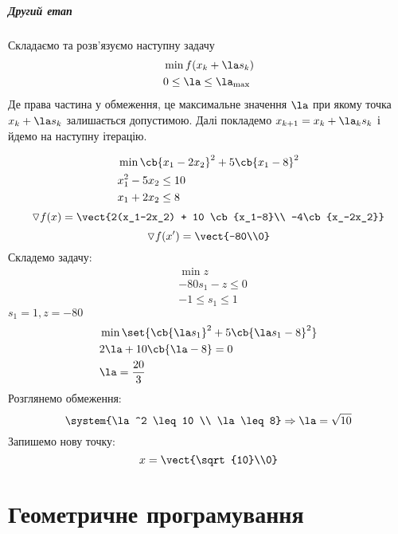 \paragraph{Другий етап} Складаємо та розв’язуємо наступну задачу 
\begin{eqnarray}
&\min f(x_k+\la s_k)\\
&0\leq \la \leq \la_{\max}
\end{eqnarray}
Де права частина у обмеження, це максимальне значення $\la$ при якому точка $x_k+\la s_k$ залишається допустимою. Далі покладемо $x_{k+1} = x_k+\la_k s_k$ і йдемо на наступну ітерацію.
\begin{exs}
\begin{eqnarray}
&\min \cb{x_1-2x_2}^2 + 5\cb{x_1-8}^2\\
&x_1^2 - 5 x_2 \leq 10\\
&x_1 + 2x_2 \leq 8
\end{eqnarray}
\begin{equation}
\triangledown f(x) = \vect{2(x_1-2x_2) + 10 \cb{x_1-8}\\ -4\cb{x_-2x_2}}
\end{equation}
\begin{equation}
\triangledown f(x') = \vect{-80\\0}
\end{equation}
Складемо задачу:
\begin{eqnarray}
&\min z \\
&-80 s_1 - z \leq 0\\
&-1 \leq s_1 \leq 1
\end{eqnarray}
$s_1 = 1,z=-80$\\
\begin{eqnarray}
&\min \set{\cb{\la s_1}^2 + 5 \cb{\la s_1-8}^2}\\
&2\la + 10\cb{\la - 8}=0\\
& \la = \dfrac{20}3
\end{eqnarray}
Розглянемо обмеження:
\begin{equation}
\system{\la^2 \leq 10 \\ \la\leq 8} \Rightarrow \la = \sqrt{10}
\end{equation}
Запишемо нову точку:
\begin{equation}
x = \vect{\sqrt{10}\\0}
\end{equation}
\end{exs}
\chapter{Геометричне програмування}
